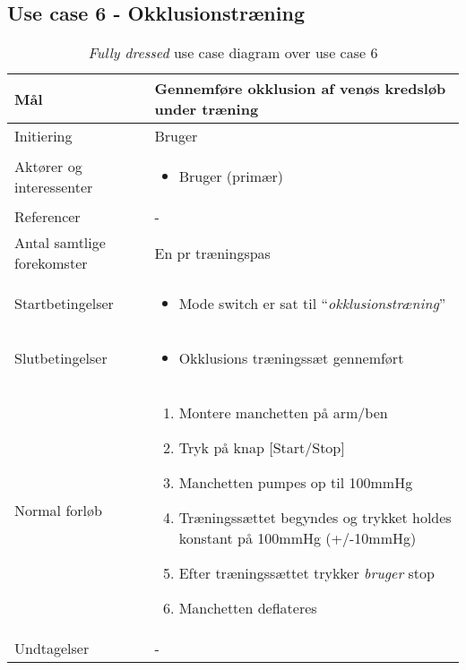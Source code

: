 	\subsection{Use case 6 - Okklusionstræning}
	\begin{table}[H]
		\begin{center}
			\begin{tabular}{ | p{} | p{}| } 
				\hline
				Mål & Gennemføre okklusion af venøs kredsløb under træning  \\ 
				\hline
				Initiering &  Bruger\\
				\hline
				Aktører og interessenter & 
				\begin{itemize}
					\item Bruger (primær)
				\end{itemize} \\ 
				\hline
				Referencer & - \\ 
				\hline
				Antal samtlige forekomster & En pr træningspas \\ 
				\hline	
				Startbetingelser & 
				\begin{itemize}
					\item Mode switch er sat til  “\textit{okklusionstræning}”
 				\end{itemize} \\ 
				\hline
				Slutbetingelser & 
				\begin{itemize}
					\item Okklusions træningssæt gennemført
				\end{itemize} \\ 
				\hline
				Normal forløb & \begin{enumerate}
					\setlength\itemsep{0cm} %
					\item Montere manchetten på arm/ben
					\item Tryk på knap [Start/Stop]
					\item Manchetten pumpes op til 100mmHg
					\item Træningssættet begyndes og trykket holdes konstant på 100mmHg (+/-10mmHg)
					\item Efter træningssættet trykker \textit{bruger} stop
					\item Manchetten deflateres
				\end{enumerate} \\ 
				\hline
				Undtagelser & - \\ 
				\hline
			\end{tabular}
		\end{center}
		
			\caption{\textit{Fully dressed} use case diagram over use case 6}
		\end{table}
	\newpage
		